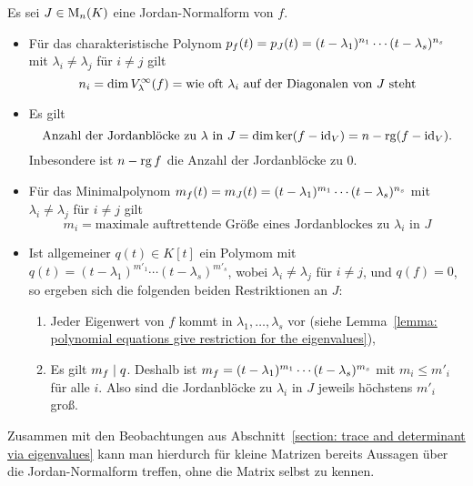Es sei $J \in \operatorname{M}_{n}(K)$ eine Jordan-Normalform von $f$.
\begin{itemize}
  \item
    Für das charakteristische Polynom $p_{f}(t) = p_{J}(t) = (t - \lambda_1)^{n_1} \dotsm (t - \lambda_s)^{n_s}$ mit $\lambda_i \neq \lambda_j$ für $i \neq j$ gilt
    \[
        n_i
      = \dim V_{\lambda}^{\infty}(f)
      = \text{wie oft $\lambda_i$ auf der Diagonalen von $J$ steht}
    \]
  \item
    Es gilt
    \[
        \text{Anzahl der Jordanblöcke zu $\lambda$ in $J$}
      = \dim \ker (f - \operatorname{id}_V)
      = n - \operatorname{rg} (f - \operatorname{id}_V).
    \]
    Inbesondere ist $n - \operatorname{rg} f$ die Anzahl der Jordanblöcke zu $0$.
  \item
    Für das Minimalpolynom $m_{f}(t) = m_{J}(t) = (t - \lambda_1)^{m_1} \dotsm (t - \lambda_s)^{n_s}$ mit $\lambda_i \neq \lambda_j$ für $i \neq j$ gilt
    \[
        m_i
      = \text{maximale auftrettende Größe eines Jordanblockes zu $\lambda_i$ in $J$}
    \]
  \item
    Ist allgemeiner $q(t) \in K[t]$ ein Polymom mit $q(t) = (t - \lambda_1)^{m'_1} \dotsm (t - \lambda_s)^{m'_s}$, wobei $\lambda_i \neq \lambda_j$ für $i \neq j$, und $q(f) = 0$, so ergeben sich die folgenden beiden Restriktionen an $J$:
    \begin{enumerate}
      \item
        Jeder Eigenwert von $f$ kommt in $\lambda_1, \dotsc, \lambda_s$ vor (siehe Lemma~\ref{lemma: polynomial equations give restriction for the eigenvalues}),
      \item
        Es gilt $m_{f} \mid q$.
        Deshalb ist $m_{f} = (t - \lambda_1)^{m_1} \dotsm (t - \lambda_s)^{m_s}$ mit $m_i \leq m'_i$ für alle $i$.
        Also sind die Jordanblöcke zu $\lambda_i$ in $J$ jeweils höchstens $m'_i$ groß.
    \end{enumerate}
\end{itemize}

Zusammen mit den Beobachtungen aus Abschnitt~\ref{section: trace and determinant via eigenvalues} kann man hierdurch für kleine Matrizen bereits Aussagen über die Jordan-Nor\-mal\-form treffen, ohne die Matrix selbst zu kennen.

